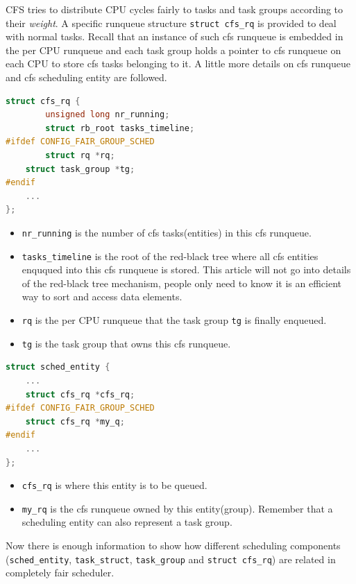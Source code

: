 CFS tries to distribute CPU cycles fairly to tasks and task groups according
to their \emph{weight}. A specific runqueue structure \texttt{struct cfs\_rq}
is provided to deal with normal tasks. 
Recall that an instance of such cfs runqueue is embedded in the per 
CPU runqueue and each task group holds a pointer
to cfs runqueue on each CPU to store cfs tasks belonging to it.
A little more details on cfs runqueue and cfs scheduling entity are followed.
\begin{lstlisting}[language=C,
		caption={\texttt{The cfs runqueue}},
		label={cfsrunqueue}]
struct cfs_rq {
        unsigned long nr_running;
        struct rb_root tasks_timeline;
#ifdef CONFIG_FAIR_GROUP_SCHED
        struct rq *rq;  
	struct task_group *tg;
#endif
	...
};
\end{lstlisting}
\begin{itemize}
\item \texttt{nr\_running} is the number of cfs tasks(entities) in this cfs 
	runqueue.
\item \texttt{tasks\_timeline} is the root of the red-black tree 
	\cite{rbtree} where 
	all cfs entities enququed into this cfs runqueue is stored. 
	This article will not go into details of the red-black tree
	mechanism, people only need to know it is an efficient way 
	to sort and access data elements.
\item \texttt{rq} is the per CPU runqueue that the task group \texttt{tg} 
	is finally enqueued.
\item \texttt{tg} is the task group that owns this cfs runqueue.
\end{itemize}
\begin{lstlisting}[language=C,
			caption={\texttt{The cfs scheduling entity}},
			label={sched_entity}]
struct sched_entity {
	...
	struct cfs_rq *cfs_rq;
#ifdef CONFIG_FAIR_GROUP_SCHED
	struct cfs_rq *my_q;
#endif
	...
}; 
\end{lstlisting}
\begin{itemize}
\item \texttt{cfs\_rq} is where this entity is to be queued.
		
\item \texttt{my\_rq} is the cfs runqueue owned by this entity(group).
	Remember that a scheduling entity can also represent a task group.
\end{itemize}
Now there is enough information to show how different scheduling components
(\texttt{sched\_entity}, \texttt{task\_struct}, \texttt{task\_group}
and \texttt{struct cfs\_rq}) are related in completely fair scheduler.

